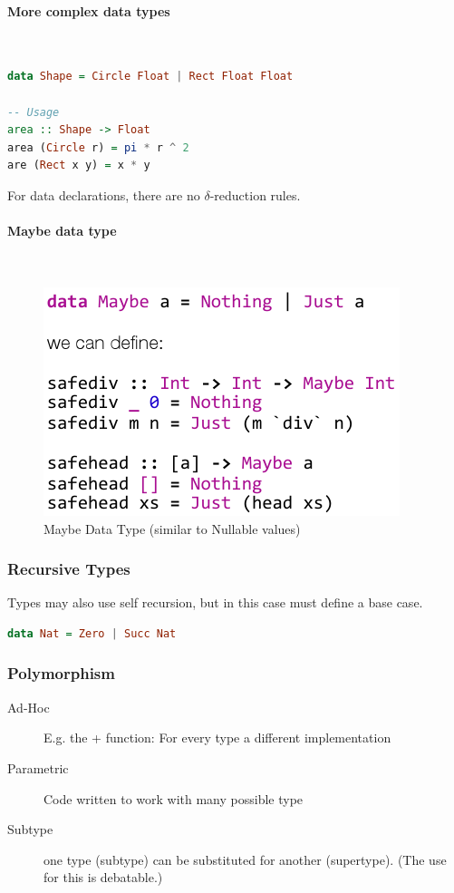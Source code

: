 \paragraph{More complex data types} \hfill \\

\begin{lstlisting}[language=haskell]
data Shape = Circle Float | Rect Float Float

-- Usage
area :: Shape -> Float
area (Circle r) = pi * r ^ 2
are (Rect x y) = x * y
\end{lstlisting}

For data declarations, there are no $\delta$-reduction rules.


\paragraph{Maybe data type} \hfill \\
\begin{figure}[h!]
\centering
\includegraphics[width=0.5\linewidth]{images/haskell_maybe_type}
\caption{Maybe Data Type (similar to Nullable values)}
\label{fig:haskellmaybetype}
\end{figure}

\subsubsection{Recursive Types}
Types may also use self recursion, but in this case must define a base case.

\begin{lstlisting}[language=haskell]
data Nat = Zero | Succ Nat
\end{lstlisting}

\subsubsection{Polymorphism}
\begin{description}
	\item[Ad-Hoc] E.g. the + function: For every type a different implementation
	\item[Parametric] Code written to work with many possible type
	\item[Subtype] one type (subtype) can be substituted for another (supertype). (The use for this is debatable.)
\end{description}


